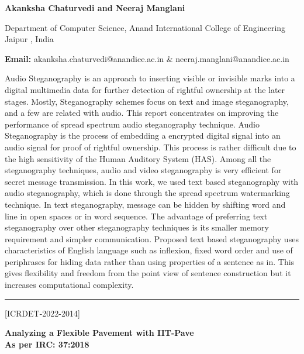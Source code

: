 \documentclass[twoside,11pt]{amsart}
\begin{document}
\centerline{\textbf{Akanksha Chaturvedi and Neeraj Manglani }}
\vskip 5mm
\begin{flushleft}
Department of Computer Science, Anand International College of Engineering Jaipur , India
\vskip 5mm
\end{flushleft}
\vskip 2mm
\begin{flushleft}
{\bf Email:} akanksha.chaturvedi@anandice.ac.in \& neeraj.manglani@anandice.ac.in
\end{flushleft}
\vskip 5mm
Audio Steganography is an approach to inserting visible or invisible marks into a digital multimedia data for further detection of rightful ownership at the later stages. Mostly, Steganography schemes focus on text and image steganography, and a few are related with audio. This report concentrates on improving the performance of spread spectrum audio steganography technique. Audio Steganography is the process of embedding a encrypted digital signal into an audio signal for proof of rightful ownership. This process is rather difficult due to the high sensitivity of the Human Auditory System (HAS). Among all the steganography techniques, audio and video steganography is very efficient for secret message transmission. In this work, we used text based steganography with audio steganography, which is done through the spread spectrum watermarking technique. In text steganography, message can be hidden by shifting word and line in open spaces or in word sequence. The advantage of preferring text steganography over other steganography techniques is its smaller memory requirement and simpler communication. Proposed text based steganography uses characteristics of English language such as inflexion, fixed word order and use of periphrases for hiding data rather than using properties of a sentence as in. This gives flexibility and freedom from the point view of sentence construction but it increases computational complexity.
\vskip 2mm

\rule{\textwidth}{0.5pt}
\vskip 5mm
\begin{flushleft}
\centerline{[ICRDET-2022-2014]}
\end{flushleft}
\begin{center}\bf\LARGE
Analyzing a Flexible Pavement with IIT-Pave\\
As per IRC: 37:2018
\end{center}
\vskip 5mm
\end{document}
